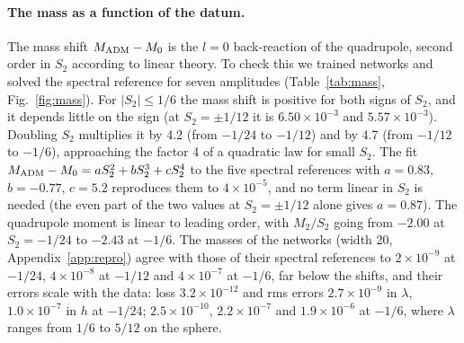 \documentclass[aps,prd,twocolumn,superscriptaddress, nofootinbib,floatfix]{revtex4-2}
\begin{document}
\paragraph{The mass as a function of the datum.} The mass shift $M_{\rm ADM}-M_0$ is the $l=0$ back-reaction of the quadrupole, second order in $S_2$ according to linear theory.
To check this we trained networks and solved the spectral reference for seven amplitudes (Table~\ref{tab:mass}, Fig.~\ref{fig:mass}).
For $|S_2|\leq1/6$ the mass shift is positive for both signs of $S_2$, and it depends little on the sign (at $S_2=\pm1/12$ it is $6.50\times10^{-3}$ and $5.57\times10^{-3}$).
Doubling $S_2$ multiplies it by 4.2 (from $-1/24$ to $-1/12$) and by 4.7 (from $-1/12$ to $-1/6$), approaching the factor 4 of a quadratic law for small $S_2$.
The fit $M_{\rm ADM}-M_0 = aS_2^2+bS_2^3+cS_2^4$ to the five spectral references with $a=0.83$, $b=-0.77$, $c=5.2$ reproduces them to $4\times10^{-5}$, and no term linear in $S_2$ is needed (the even part of the two values at $S_2=\pm1/12$ alone gives $a = 0.87$).
The quadrupole moment is linear to leading order, with $M_2/S_2$ going from $-2.00$ at $S_2=-1/24$ to $-2.43$ at $-1/6$.
The masses of the networks (width 20, Appendix~\ref{app:repro}) agree with those of their spectral references to $2\times10^{-9}$ at $-1/24$, $4\times10^{-8}$ at $-1/12$ and $4\times10^{-7}$ at $-1/6$, far below the shifts, and their errors scale with the data: loss $3.2\times10^{-12}$ and rms errors $2.7\times10^{-9}$ in $\lambda$, $1.0\times10^{-7}$ in $h$ at $-1/24$; $2.5\times10^{-10}$, $2.2\times10^{-7}$ and $1.9\times10^{-6}$ at $-1/6$, where $\lambda$ ranges from $1/6$ to $5/12$ on the sphere.
\end{document}
